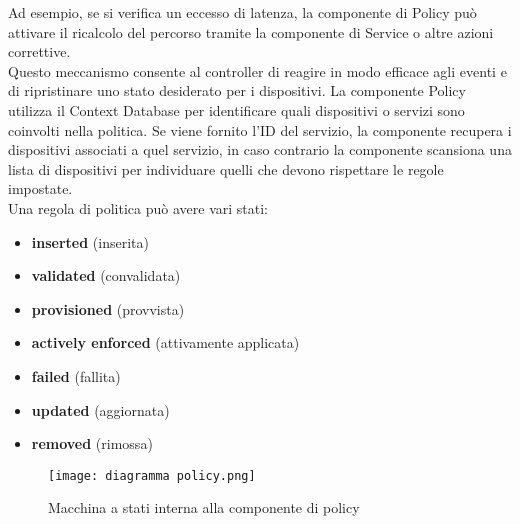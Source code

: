 Ad esempio, se si verifica un eccesso di latenza, la componente di Policy può attivare il ricalcolo del percorso tramite la componente di Service o altre azioni correttive.
\\Questo meccanismo consente al controller di reagire in modo efficace agli eventi e di ripristinare uno stato desiderato per i dispositivi.
La componente Policy utilizza il Context Database per identificare quali dispositivi o servizi sono coinvolti nella politica.
Se viene fornito l'ID del servizio, la componente recupera i dispositivi associati a quel servizio, in caso contrario la componente scansiona una lista di dispositivi per individuare quelli che devono rispettare le regole impostate. 
\\Una regola di politica può avere vari stati:
\begin{itemize}
    \item \textbf{inserted} (inserita)
    \item \textbf{validated} (convalidata)
    \item \textbf{provisioned} (provvista)
    \item \textbf{actively enforced} (attivamente applicata)
    \item \textbf{failed} (fallita)
    \item \textbf{updated} (aggiornata)
    \item \textbf{removed} (rimossa)
\end{itemize}
\begin{figure}[h]
    \centering
   \texttt{[image: diagramma policy.png]}
    \caption{Macchina a stati interna alla componente di policy \cite{D32}}
    \label{fig:diagramma}
\end{figure}
